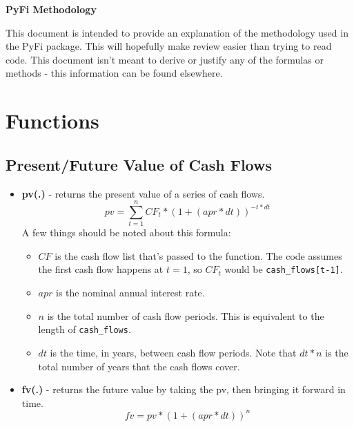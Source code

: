 \documentclass[10pt]{article}
\begin{document}
\begin{center}
    {\bfseries\Huge PyFi Methodology}\\[20pt]
\end{center}

\begin{flushleft}
    This document is intended to provide an explanation of the methodology used in the PyFi package.
    This will hopefully make review easier than trying to read code. This document isn't meant to
    derive or justify any of the formulas or methods - this information can be found elsewhere.
\end{flushleft}

\section{Functions}
\subsection{Present/Future Value of Cash Flows}
\begin{itemize}
\item \textbf{pv(.)} - returns the present value of a series of cash flows.\\
    \begin{equation}
        pv = \sum_{t=1}^n CF_t * (1 + (apr*dt))^{-t*dt}
    \end{equation}
    A few things should be noted about this formula:
    \begin{itemize}
    \item $CF$ is the cash flow list that's passed to the function. The code assumes the first cash flow
        happens at $t=1$, so $CF_t$ would be \texttt{cash\_flows[t-1]}.
    \item $apr$ is the nominal annual interest rate.
    \item $n$ is the total number of cash flow periods. This is equivalent to the length of 
        \texttt{cash\_flows}.
    \item $dt$ is the time, in years, between cash flow periods. Note that $dt*n$ is the total number
        of years that the cash flows cover.
    \end{itemize}
\item \textbf{fv(.)} - returns the future value by taking the pv, then bringing it forward in time.\\
    \begin{equation}
        fv = pv*(1 + (apr*dt))^{n}
    \end{equation}
\end{itemize}
\end{document}
